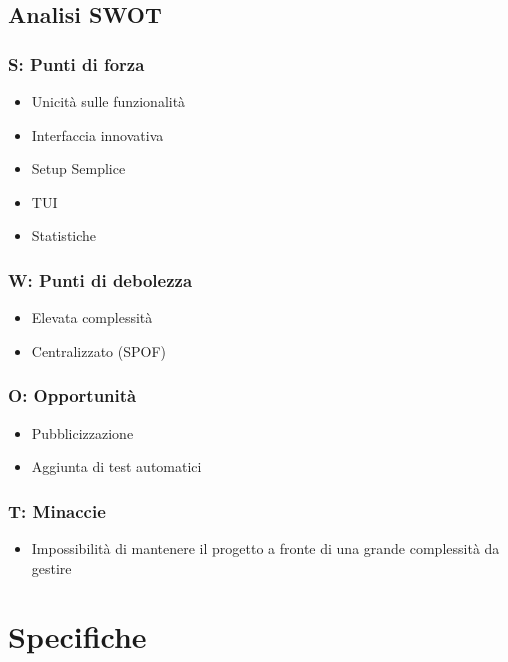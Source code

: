 \documentclass[11pt]{article}
\begin{document}
\subsection{Analisi SWOT}
\subsubsection{S: Punti di forza}
\begin{itemize}
	\item Unicità sulle funzionalità
	\item Interfaccia innovativa
	\item Setup Semplice
	\item TUI
	\item Statistiche
\end{itemize}
\subsubsection{W: Punti di debolezza}
\begin{itemize}
	\item Elevata complessità
	\item Centralizzato (SPOF)
\end{itemize}
\subsubsection{O: Opportunità}
\begin{itemize}
	\item Pubblicizzazione
	\item Aggiunta di test automatici
\end{itemize}
\subsubsection{T: Minaccie}
\begin{itemize}
	\item Impossibilità di mantenere il progetto a fronte di una grande complessità da gestire
\end{itemize}

\section{Specifiche}
\end{document}
